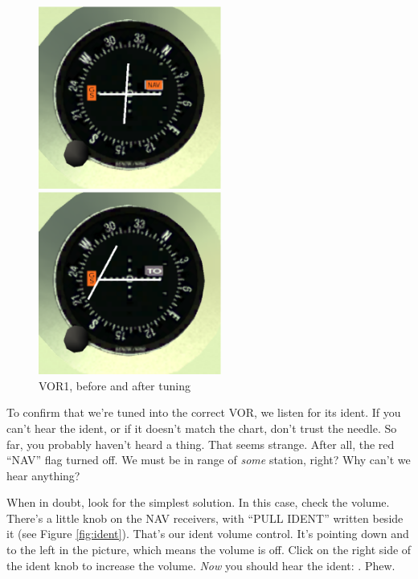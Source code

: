 \begin{figure}
  \begin{minipage}[b]{0.5\linewidth}
    \includegraphics[width=6cm]{img/VOR1_before}
  \end{minipage}
  \hspace{0.5cm}
  \begin{minipage}[b]{0.5\linewidth}
    \includegraphics[width=6cm]{img/VOR1_after}
  \end{minipage}
  \caption{VOR1, before and after tuning}
  \label{fig:VOR1}
\end{figure}

To confirm that we're tuned into the correct VOR, we listen for its
ident.  If you can't hear the ident, or if it doesn't match the chart,
don't trust the needle.  So far, you probably haven't heard a thing.
That seems strange.  After all, the red ``NAV'' flag turned off.  We
must be in range of \emph{some} station, right?  Why can't we hear
anything?

When in doubt, look for the simplest solution.  In this case, check
the volume.  There's a little knob on the NAV receivers, with ``PULL
IDENT'' written beside it (see Figure \ref{fig:ident}).  That's our
ident volume control.  It's pointing down and to the left in the
picture, which means the volume is off.  Click on the right side of
the ident knob to increase the volume.  \emph{Now} you should hear the
ident: \mdot\mdot\mdot\mspace \mdot\mdash\mdash\mdash\mspace
\mdash\mdot\mdash\mdot.  Phew.

